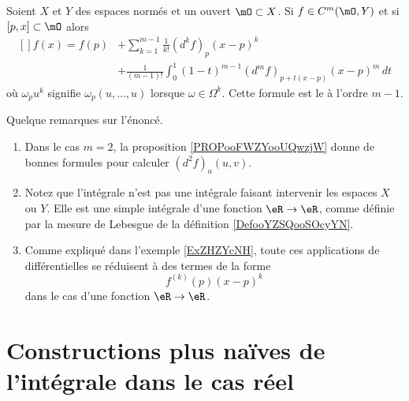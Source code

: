 \begin{proposition}\label{PropAXaSClx}
    Soient \( X\) et \( Y\) des espaces normés et un ouvert \( \mO\subset X\). Si \( f\in C^m(\mO,Y)\) et si \( [p,x]\subset \mO\) alors
    \begin{equation}
        \begin{aligned}[]
            f(x)=f(p)&+\sum_{k=1}^{m-1}\frac{1}{ k! }(d^kf)_p (x-p)^k \\
            &+\frac{1}{ (m-1)! }\int_0^1(1-t)^{m-1}(d^mf)_{ p+t(x-p) }(x-p)^m\,dt 
        \end{aligned}
    \end{equation}
    où \( \omega_pu^k\) signifie \( \omega_p(u,\ldots, u)\) lorsque \( \omega\in \Omega^k\). Cette formule est le  à l'ordre \( m-1\).
\end{proposition}

\begin{remark}
    Quelque remarques sur l'énoncé.
    \begin{enumerate}
        \item
            
Dans le cas \( m=2\), la proposition \ref{PROPooFWZYooUQwzjW} donne de bonnes formules pour calculer \( (d^2f)_a(u,v)\).
\item
Notez que l'intégrale n'est pas une intégrale faisant intervenir les espaces \( X\) ou \( Y\). Elle est une simple intégrale d'une fonction \( \eR\to \eR\), comme définie par la mesure de Lebesgue de la définition \ref{DefooYZSQooSOcyYN}.
\item
Comme expliqué dans l'exemple \ref{ExZHZYcNH}, toute ces applications de différentielles se réduisent à des termes de la forme
\begin{equation}
    f^{(k)}(p)(x-p)^k
\end{equation}
dans le cas d'une fonction \( \eR\to\eR\).
    \end{enumerate}
\end{remark}

\section{Constructions plus naïves de l'intégrale dans le cas réel}

